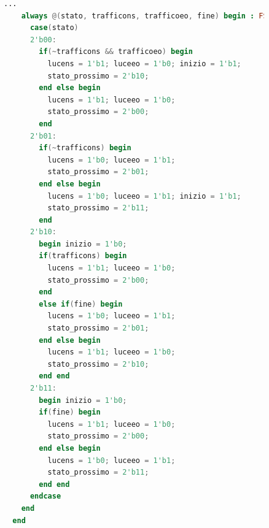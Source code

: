 \documentclass[a4paper]{article}
\theoremstyle{break}
\theoremstyle{break}
\theoremstyle{break}
\theoremstyle{break}
\begin{document}
\begin{figure}[H]
  \begin{lstlisting}[language=Verilog]
    ...
    always @(stato, trafficons, trafficoeo, fine) begin : FSM
      case(stato)
      2'b00:
        if(~trafficons && trafficoeo) begin
          lucens = 1'b1; luceeo = 1'b0; inizio = 1'b1;
          stato_prossimo = 2'b10;
        end else begin
          lucens = 1'b1; luceeo = 1'b0;
          stato_prossimo = 2'b00;
        end
      2'b01:
        if(~trafficons) begin
          lucens = 1'b0; luceeo = 1'b1;
          stato_prossimo = 2'b01;
        end else begin
          lucens = 1'b0; luceeo = 1'b1; inizio = 1'b1;
          stato_prossimo = 2'b11;
        end
      2'b10:
        begin inizio = 1'b0;
        if(trafficons) begin
          lucens = 1'b1; luceeo = 1'b0;
          stato_prossimo = 2'b00;
        end
        else if(fine) begin
          lucens = 1'b0; luceeo = 1'b1;
          stato_prossimo = 2'b01;
        end else begin
          lucens = 1'b1; luceeo = 1'b0;
          stato_prossimo = 2'b10;
        end end
      2'b11:
        begin inizio = 1'b0;
        if(fine) begin
          lucens = 1'b1; luceeo = 1'b0;
          stato_prossimo = 2'b00;
        end else begin
          lucens = 1'b0; luceeo = 1'b1;
          stato_prossimo = 2'b11;
        end end
      endcase
    end
  end
  \end{lstlisting}
\end{figure}
\end{document}
